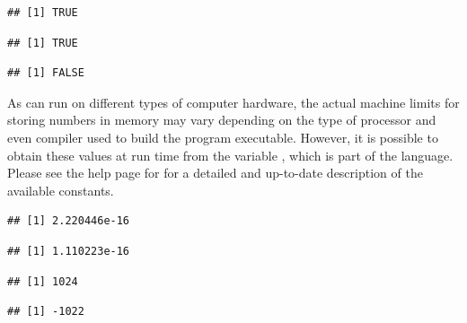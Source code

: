 \documentclass[krantz2]{krantz}\usepackage{knitr}
\begin{document}
\begin{explainbox}
\begin{knitrout}\footnotesize
{}\color{fgcolor}\begin{kframe}
\begin{alltt}
 \hlopt{==}  \hlopt{+} 
\end{alltt}
\begin{verbatim}
## [1] TRUE
\end{verbatim}
\begin{alltt}
 \hlopt{==}  \hlopt{+} 
\end{alltt}
\begin{verbatim}
## [1] TRUE
\end{verbatim}
\begin{alltt}
 \hlopt{==} 
\end{alltt}
\begin{verbatim}
## [1] FALSE
\end{verbatim}
\end{kframe}
\end{knitrout}

As \Rpgrm can run on different types of computer hardware, the actual machine limits for storing numbers in memory may vary depending on the type of processor and even compiler used to build the \Rpgrm program executable. However, it is possible to obtain these values at run time from the variable , which is part of the \Rlang language. Please see the help page for  for a detailed and up-to-date description of the available constants.

\begin{knitrout}\footnotesize
{}\color{fgcolor}\begin{kframe}
\begin{alltt}
\hlopt{$}
\end{alltt}
\begin{verbatim}
## [1] 2.220446e-16
\end{verbatim}
\begin{alltt}
\hlopt{$}
\end{alltt}
\begin{verbatim}
## [1] 1.110223e-16
\end{verbatim}
\begin{alltt}
\hlopt{$}
\end{alltt}
\begin{verbatim}
## [1] 1024
\end{verbatim}
\begin{alltt}
\hlopt{$}
\end{alltt}
\begin{verbatim}
## [1] -1022
\end{verbatim}
\end{kframe}
\end{knitrout}


\end{explainbox}
\end{document}
